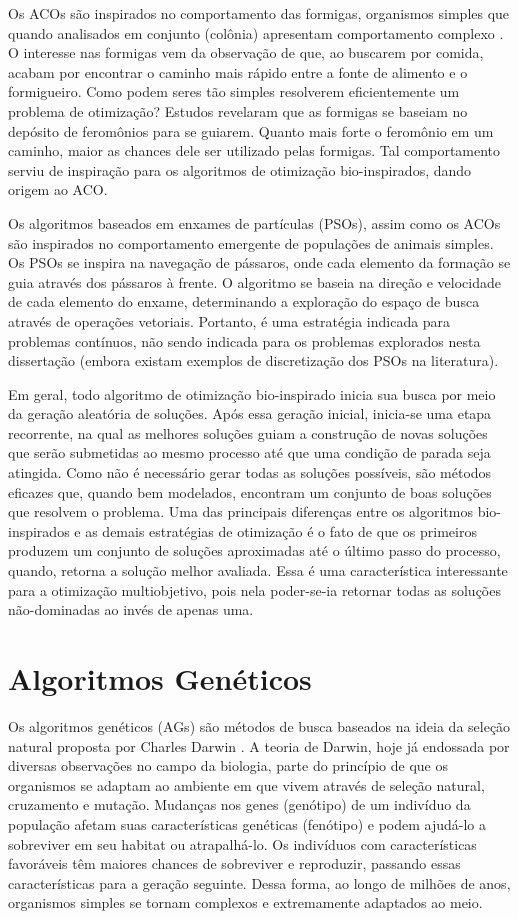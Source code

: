 Os ACOs são inspirados no comportamento das formigas, organismos simples que quando analisados em conjunto (colônia) apresentam comportamento complexo \cite{Dorigo1996}. O interesse nas formigas vem da observação de que, ao buscarem por comida, acabam por encontrar o caminho mais rápido entre a fonte de alimento e o formigueiro. Como podem seres tão simples resolverem eficientemente um problema de otimização? Estudos revelaram que as formigas se baseiam no depósito de feromônios para se guiarem. Quanto mais forte o feromônio em um caminho, maior as chances dele ser utilizado pelas formigas. Tal comportamento serviu de inspiração para os algoritmos de otimização bio-inspirados, dando origem ao \ac{ACO}.

Os algoritmos baseados em enxames de partículas (PSOs), assim como os ACOs são inspirados no comportamento emergente de populações de animais simples. Os PSOs se inspira na navegação de pássaros, onde cada elemento da formação se guia através dos pássaros à frente. O algoritmo se baseia na direção e velocidade de cada elemento do enxame, determinando a exploração do espaço de busca através de operações vetoriais. Portanto, é uma estratégia indicada para problemas contínuos, não sendo indicada para os problemas explorados nesta dissertação (embora existam exemplos de discretização dos PSOs na literatura).

Em geral, todo algoritmo de otimização bio-inspirado inicia sua busca por meio da geração aleatória de soluções. Após essa geração inicial, inicia-se uma etapa recorrente, na qual as melhores soluções guiam a construção de novas soluções que serão submetidas ao mesmo processo até que uma condição de parada seja atingida. Como não é necessário gerar todas as soluções possíveis, são métodos eficazes que, quando bem modelados, encontram um conjunto de boas soluções que resolvem o problema. Uma das principais diferenças entre os algoritmos bio-inspirados e as demais estratégias de otimização é o fato de que os primeiros produzem um conjunto de soluções aproximadas até o último passo do processo, quando, retorna a solução melhor avaliada. Essa é uma característica interessante para a otimização multiobjetivo, pois nela poder-se-ia retornar todas as soluções não-dominadas ao invés de apenas uma.

\section{Algoritmos Genéticos}
\label{section_ag}
Os algoritmos genéticos (AGs) são métodos de busca baseados na ideia da seleção natural proposta por Charles Darwin \cite{Darwin1859}. A teoria de Darwin, hoje já endossada por diversas observações no campo da biologia, parte do princípio de que os organismos se adaptam ao ambiente em que vivem através de seleção natural, cruzamento e mutação. Mudanças nos genes (genótipo) de um indivíduo da população afetam suas características genéticas (fenótipo) e podem ajudá-lo a sobreviver em seu habitat ou atrapalhá-lo. Os indivíduos com características favoráveis têm maiores chances de sobreviver e reproduzir, passando essas características para a geração seguinte. Dessa forma, ao longo de milhões de anos, organismos simples se tornam complexos e extremamente adaptados ao meio.

